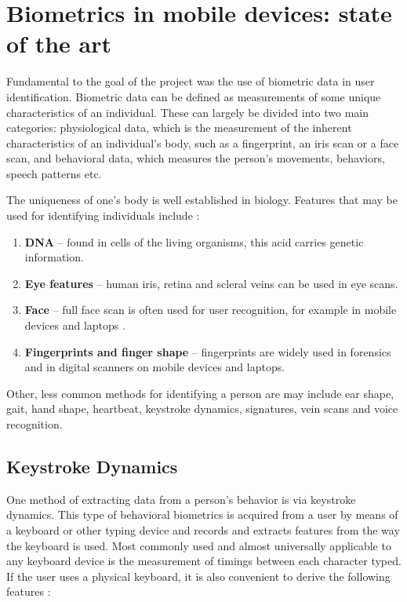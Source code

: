 
\chapter{Biometrics in mobile devices: state of the art} \label{biometrics_theory}

Fundamental to the goal of the project was the use of biometric data in user identification. Biometric data can be defined as measurements of some unique characteristics of an individual. These can largely be divided into two main categories: physiological data, which is the measurement of the inherent characteristics of an individual's body, such as a fingerprint, an iris scan or a face scan, and behavioral data, which measures the person's movements, behaviors, speech patterns etc. \cite{Abde2023}

The uniqueness of one's body is well established in biology. Features that may be used for identifying individuals include \cite{biometrics_institute_2025}:

\begin{enumerate}
    \item \textbf{DNA} -- found in cells of the living organisms, this acid carries genetic information.
    \item \textbf{Eye features} -- human iris, retina and scleral veins can be used in eye scans.
    \item \textbf{Face} -- full face scan is often used for user recognition, for example in mobile devices and laptops \cite{google_mlkit_face_detection_2025}.
    \item \textbf{Fingerprints and finger shape} -- fingerprints are widely used in forensics \cite{nist_forensic_biometrics_2025} and in digital scanners on mobile devices and laptops.
\end{enumerate}

Other, less common methods for identifying a person are may include ear shape, gait, hand shape, heartbeat, keystroke dynamics, signatures, vein scans and voice recognition.

\section{Keystroke Dynamics}
One method of extracting data from a person's behavior is via keystroke dynamics. This type of behavioral biometrics is acquired from a user by means of a keyboard or other typing device and records and extracts features from the way the keyboard is used. Most commonly used and almost universally applicable to any keyboard device is the measurement of timings between each character typed. If the user uses a physical keyboard, it is also convenient to derive the following features \cite{Shar2023}:

